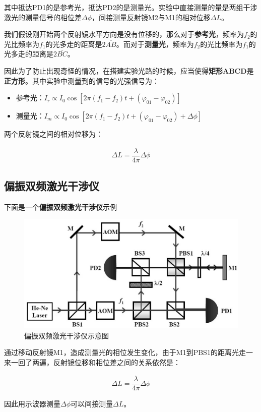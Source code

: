 \documentclass{article}
\begin{document}
其中抵达PD1的是参考光，抵达PD2的是测量光。实验中直接测量的量是两组干涉激光的测量信号的相位差$\Delta \phi$，间接测量反射镜M2与M1的相对位移$\Delta L$。

我们假设刚开始两个反射镜水平方向是没有位移的，那么对于\textbf{参考光}，频率为$f_2$的光比频率为$f_1$的光多走的距离是$2 \overline{AB}$。而对于\textbf{测量光}，频率为$f_2$的光比频率为$f_1$的光多走的距离是$2 \overline{BC}$。

因此为了防止出现奇怪的情况，在搭建实验光路的时候，应当使得\textbf{矩形ABCD}是\textbf{正方形}。其中实验中测量到的信号的光强信号为：

\begin{itemize}
\item 参考光：$I_r \propto I_0 \cos \left[ 2 \pi \left( f_1 - f_2 \right)t + \left( \varphi_{01} - \varphi_{02} \right) \right] $
\item 测量光：$I_m \propto I_0 \cos \left[ 2 \pi \left( f_1 - f_2 \right)t + \left( \varphi_{01} - \varphi_{02} \right) + \Delta \phi \right] $
\end{itemize}

两个反射镜之间的相对位移为：

\begin{equation*}
  \begin{aligned}
    \Delta L = \dfrac{\lambda}{4 \pi} \Delta \phi 
  \end{aligned}
\end{equation*}

\subsection{偏振双频激光干涉仪}

下面是一个\textbf{偏振双频激光干涉仪}示例

\begin{figure}[H]
  \centering
  \includegraphics[width=0.9\linewidth]{figures/偏振双频激光干涉仪}
  \caption{偏振双频激光干涉仪示意图}
\end{figure}

通过移动反射镜M1，造成测量光的相位发生变化，由于M1到PBS1的距离光走一来一回了两遍，反射镜位移和相位差之间的关系依然是：

\begin{equation*}
  \begin{aligned}
    \Delta L = \dfrac{\lambda}{4 \pi} \Delta \phi
  \end{aligned}
\end{equation*}

因此用示波器测量$\Delta \phi$可以间接测量$\Delta L$。
\end{document}
